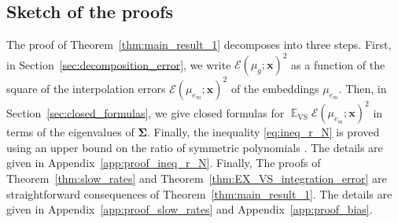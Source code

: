 \documentclass[twoside,11pt]{book}
\numberwithin{theorem}{chapter}
\numberwithin{definition}{chapter}
\numberwithin{proposition}{chapter}
\numberwithin{corollary}{chapter}
\numberwithin{example}{chapter}
\numberwithin{lemma}{chapter}
\DeclareMathOperator{\VS}{\mathrm{VS}}
\DeclareMathOperator{\EX}{\mathbb{E}}
\DeclareMathOperator{\F}{\mathcal{F}}
\begin{document}


\subsection{Sketch of the proofs}\label{sec:steps_proof}
 The proof of Theorem~\ref{thm:main_result_1} decomposes into three steps. First, in Section~\ref{sec:decomposition_error}, we write $\mathcal{E}(\mu_{g};\bm{x})^{2}$ as a function of the square of the interpolation errors $\mathcal{E}(\mu_{e_{m}};\bm{x})^{2}$ of the embeddings
$\mu_{e_{m}}$. Then, in Section~\ref{sec:closed_formulas}, we give closed formulas for $\EX_{\VS} \mathcal{E}(\mu_{e_{m}};\bm{x})^{2}$ in terms of the eigenvalues of $\bm{\Sigma}$. Finally, the inequality \eqref{eq:ineq_r_N} is proved using an upper bound on the ratio of symmetric polynomials \citep{GuSi12}. The details are given in Appendix~\ref{app:proof_ineq_r_N}. Finally, The proofs of Theorem~\ref{thm:slow_rates} and Theorem~\ref{thm:EX_VS_integration_error} are straightforward consequences of Theorem~\ref{thm:main_result_1}. The details are given in Appendix~\ref{app:proof_slow_rates} and Appendix~\ref{app:proof_bias}.
\end{document}
